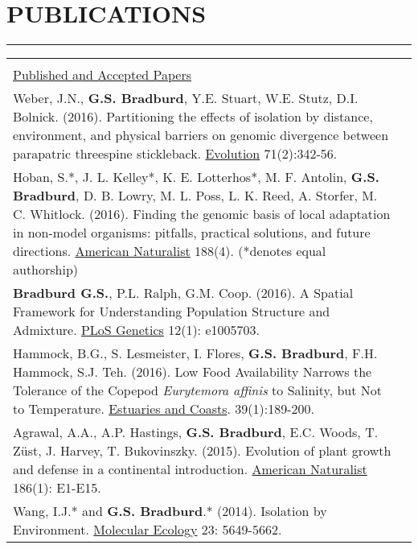 \documentclass{article}
\begin{document}
\section*{PUBLICATIONS}
\vspace{-0.6cm}
\rule{470pt}{0.4pt}
%
\begin{tabular}{>{\everypar{\hangindent1cm}}p{}p{}}
\hfill\\
%
\vspace{0.2cm}
%
\underline{Published and Accepted Papers} \hfill\\
\vspace{-0.1cm}
Weber, J.N., \textbf{G.S. Bradburd}, Y.E. Stuart, W.E. Stutz, D.I. Bolnick. (2016).
Partitioning the effects of isolation by distance, environment, and physical barriers 
on genomic divergence between parapatric threespine stickleback.
\underline{Evolution} 71(2):342-56. \\
%
\vspace{-0.1cm}
Hoban, S.*, J. L. Kelley*, K. E. Lotterhos*, M. F. Antolin, \textbf{G.S. Bradburd}, D. B. Lowry, M. L. Poss, L. K. Reed, A. Storfer, M. C. Whitlock. (2016). Finding the genomic basis of local adaptation in non-model organisms: pitfalls, practical solutions, and future directions. \underline{American Naturalist} 188(4). (*denotes equal authorship)\\
%
\vspace{-0.1cm}
\textbf{Bradburd G.S.}, P.L. Ralph, G.M. Coop. (2016). A Spatial Framework for Understanding Population Structure and Admixture. \underline{PLoS Genetics} 12(1): e1005703.\\
%
\vspace{-0.1cm}
Hammock, B.G., S. Lesmeister, I. Flores, \textbf{G.S. Bradburd}, F.H. Hammock, S.J. Teh. (2016). Low Food Availability Narrows the Tolerance of the Copepod \textit{Eurytemora affinis} to Salinity, but Not to Temperature. \underline{Estuaries and Coasts}.  39(1):189-200.\\
%
\vspace{-0.1cm}
Agrawal, A.A., A.P. Hastings, \textbf{G.S. Bradburd}, E.C. Woods, T. Z{\"u}st, J. Harvey, T. Bukovinszky. (2015).
Evolution of plant growth and defense in a continental introduction. \underline{American Naturalist} 186(1): E1-E15.\\
%
\vspace{-0.1cm}
Wang, I.J.* and \textbf{G.S. Bradburd}.* (2014). Isolation by Environment. \underline{Molecular Ecology} 23: 5649-5662.  & \hfill\\

\end{tabular}
\end{document}
